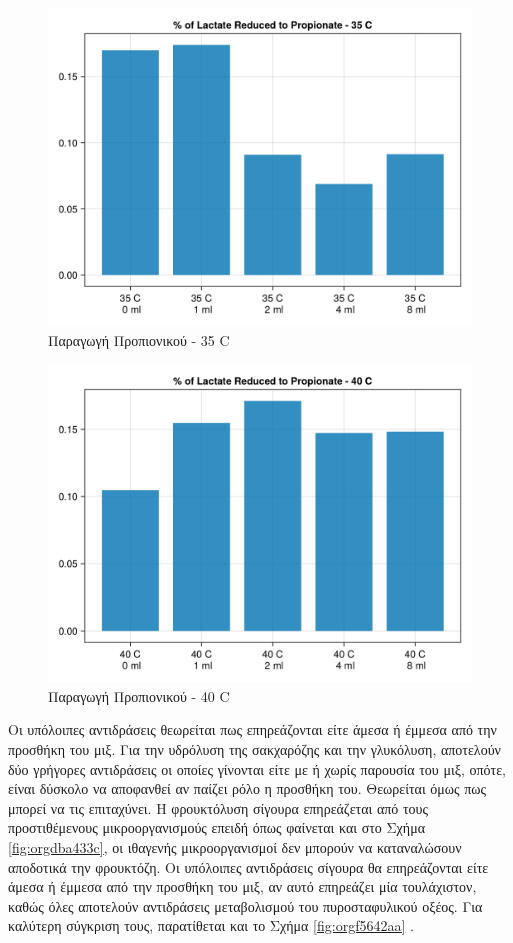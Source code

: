 \documentclass[11pt]{report}
\begin{document}
\begin{figure}[htbp]
\centering
\includegraphics[width=.9\linewidth]{../plots/metabolic_results/propionate_flux_35.png}
\caption{\label{fig:org999d3b8}Παραγωγή Προπιονικού - 35 C}
\end{figure}

\begin{figure}[htbp]
\centering
\includegraphics[width=.9\linewidth]{../plots/metabolic_results/propionate_flux_40.png}
\caption{\label{fig:org3f41e97}Παραγωγή Προπιονικού - 40 C}
\end{figure}

Οι υπόλοιπες αντιδράσεις θεωρείται πως επηρεάζονται είτε άμεσα ή έμμεσα από την προσθήκη του μιξ. Για την υδρόλυση της σακχαρόζης και την γλυκόλυση, αποτελούν δύο γρήγορες αντιδράσεις οι οποίες γίνονται είτε με ή χωρίς παρουσία του μιξ, οπότε, είναι δύσκολο να αποφανθεί αν παίζει ρόλο η προσθήκη του. Θεωρείται όμως πως μπορεί να τις επιταχύνει. Η φρουκτόλυση σίγουρα επηρεάζεται από τους προστιθέμενους μικροοργανισμούς επειδή όπως φαίνεται και στο Σχήμα \ref{fig:orgdba433c}, οι ιθαγενής μικροοργανισμοί δεν μπορούν να καταναλώσουν αποδοτικά την φρουκτόζη. Οι υπόλοιπες αντιδράσεις σίγουρα θα επηρεάζονται είτε άμεσα ή έμμεσα από την προσθήκη του μιξ, αν αυτό επηρεάζει μία τουλάχιστον, καθώς όλες αποτελούν αντιδράσεις μεταβολισμού του πυροσταφυλικού οξέος. Για καλύτερη σύγκριση τους, παρατίθεται και το Σχήμα \ref{fig:orgf5642aa} . 
\end{document}
